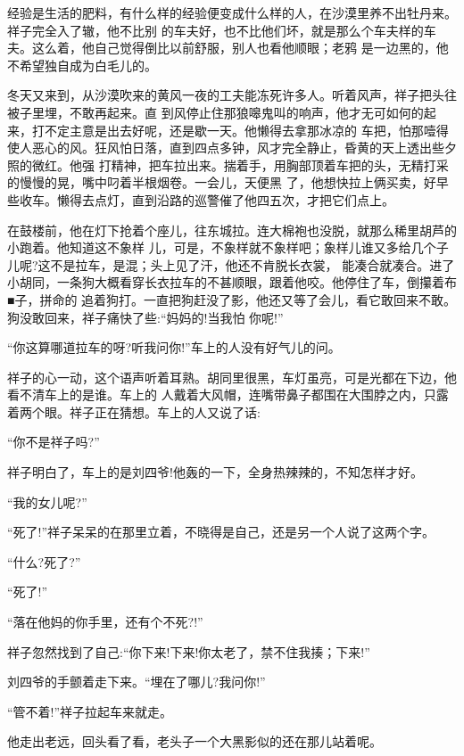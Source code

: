 \documentclass[11pt,a4paper,onecolumn]{article}
\begin{document}
经验是生活的肥料，有什么样的经验便变成什么样的人，在沙漠里养不出牡丹来。祥子完全入了辙，他不比别
的车夫好，也不比他们坏，就是那么个车夫样的车夫。这么着，他自己觉得倒比以前舒服，别人也看他顺眼；老鸦
是一边黑的，他不希望独自成为白毛儿的。

冬天又来到，从沙漠吹来的黄风一夜的工夫能冻死许多人。听着风声，祥子把头往被子里埋，不敢再起来。直
到风停止住那狼嗥鬼叫的响声，他才无可如何的起来，打不定主意是出去好呢，还是歇一天。他懒得去拿那冰凉的
车把，怕那噎得使人恶心的风。狂风怕日落，直到四点多钟，风才完全静止，昏黄的天上透出些夕照的微红。他强
打精神，把车拉出来。揣着手，用胸部顶着车把的头，无精打采的慢慢的晃，嘴中叼着半根烟卷。一会儿，天便黑
了，他想快拉上俩买卖，好早些收车。懒得去点灯，直到沿路的巡警催了他四五次，才把它们点上。

在鼓楼前，他在灯下抢着个座儿，往东城拉。连大棉袍也没脱，就那么稀里胡芦的小跑着。他知道这不象样
儿，可是，不象样就不象样吧；象样儿谁又多给几个子儿呢?这不是拉车，是混；头上见了汗，他还不肯脱长衣裳，
能凑合就凑合。进了小胡同，一条狗大概看穿长衣拉车的不甚顺眼，跟着他咬。他停住了车，倒攥着布■子，拼命的
追着狗打。一直把狗赶没了影，他还又等了会儿，看它敢回来不敢。狗没敢回来，祥子痛快了些:``妈妈的!当我怕
你呢!''

``你这算哪道拉车的呀?听我问你!''车上的人没有好气儿的问。

祥子的心一动，这个语声听着耳熟。胡同里很黑，车灯虽亮，可是光都在下边，他看不清车上的是谁。车上的
人戴着大风帽，连嘴带鼻子都围在大围脖之内，只露着两个眼。祥子正在猜想。车上的人又说了话:

``你不是祥子吗?''

祥子明白了，车上的是刘四爷!他轰的一下，全身热辣辣的，不知怎样才好。

``我的女儿呢?''

``死了!''祥子呆呆的在那里立着，不晓得是自己，还是另一个人说了这两个字。

``什么?死了?''

``死了!''

``落在他妈的你手里，还有个不死?!''

祥子忽然找到了自己:``你下来!下来!你太老了，禁不住我揍；下来!''

刘四爷的手颤着走下来。``埋在了哪儿?我问你!''

``管不着!''祥子拉起车来就走。

他走出老远，回头看了看，老头子\myrule 一个大黑影似的\myrule 还在那儿站着呢。

\pagebreak
\section{}
\end{document}
